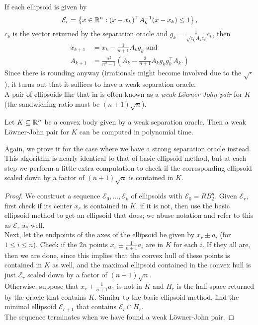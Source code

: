 If each ellipsoid is given by
\[ \mathcal{E}_r = \left\{x\in\mathbb{R}^n : (x-x_k)^\top A_k^{-1} (x-x_k) \leq 1 \right\}, \]
$c_k$ is the vector returned by the separation oracle and $g_k = \frac{1}{\sqrt{c_k^\top A_k c_k}} c_k$, then
\begin{align*}
    x_{k+1} &= x_k - \frac{1}{n+1}A_k g_k\text{ and } \\
    A_{k+1} &= \frac{n^2}{n^2-1} \left( A_k - \frac{2}{n+1}A_k g_k g_k^\top A_k. \right)
\end{align*}
Since there is rounding anyway (irrationals might become involved due to the $\sqrt{\cdot}$), it turns out that it suffices to have a weak separation oracle.\\

A pair of ellipsoids like that in  is often known as a \textit{weak L\"owner-John pair} for $K$ (the sandwiching ratio must be $(n+1)\sqrt n$). 

\begin{ftheo}
\label{lovasz pre-sandwich}
Let $K\subseteq\mathbb{R}^n$ be a convex body given by a weak separation oracle. Then a weak L\"owner-John pair for $K$ can be computed in polynomial time. 
\end{ftheo}
Again, we prove it for the case where we have a strong separation oracle instead. This algorithm is nearly identical to that of basic ellipsoid method, but at each step we perform a little extra computation to check if the corresponding ellipsoid scaled down by a factor of $(n+1)\sqrt{n}$ is contained in $K$.
\begin{proof}
We construct a sequence $\mathcal{E}_0,\ldots,\mathcal{E}_k$ of ellipsoids with $\mathcal{E}_0=R B_2^n$. Given $\mathcal{E}_r$, first check if its center $x_r$ is contained in $K$. if it is not, then use the basic ellipsoid method to get an ellipsoid that does; we abuse notation and refer to this as $\mathcal{E}_r$ as well.\\
Next, let the endpoints of the axes of the ellipsoid be given by $x_r \pm a_i$ (for $1\leq i\leq n$). Check if the $2n$ points $x_r \pm \frac{1}{n+1} a_i$ are in $K$ for each $i$. If they all are, then we are done, since this implies that the convex hull of these points is contained in $K$ as well, and the maximal ellipsoid contained in the convex hull is just $\mathcal{E}_r$ scaled down by a factor of $(n+1)\sqrt{n}$.\\
Otherwise, suppose that $x_r+\frac{1}{n+1}a_1$ is not in $K$ and $H_r$ is the half-space returned by the oracle that contains $K$. Similar to the basic ellipsoid method, find the minimal ellipsoid $\mathcal{E}_{r+1}$ that contains $\mathcal{E}_r\cap H_r$.\\
The sequence terminates when we have found a weak L\"owner-John pair.
\end{proof}

